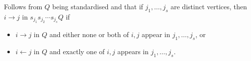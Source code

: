 Follows from $Q$ being standardised and that if $j_1, \ldots, j_s$ are distinct
vertices, then $i\to j$ in $s_{j_1}s_{j_2}\cdots s_{j_s}Q$ if
\begin{itemize}
	\item $i\to j$ in $Q$ and either none or both of  $i, j$ appear in $j_1, \ldots, j_s$, or
	\item $i\leftarrow j$ in $Q$ and exactly one of $i, j$ appears in $j_1, \ldots, j_s$.
\end{itemize}
